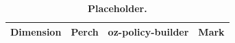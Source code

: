 \begin{table}[tbp]
\centering
\caption{\textbf{Placeholder.} }\label{tab:tab-compare-full}
\footnotesize\begin{tabularx}{\linewidth}{@{}LLLL@{}}
\toprule
\textbf{Dimension} & \textbf{Perch} & \textbf{oz-policy-builder} & \textbf{Mark} \\
\midrule

\bottomrule
\end{tabularx}
\end{table}
